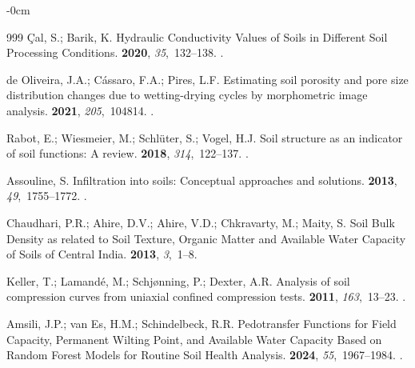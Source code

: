 \documentclass[land,review,accept,pdftex,oneauthor]{Definitions/mdpi}
\begin{document}
\begin{adjustwidth}{-\extralength}{0cm}
\begin{thebibliography}{999}
Çal, S.; Barik, K.
\newblock Hydraulic Conductivity Values of Soils in Different Soil Processing
  Conditions.
 {\bf 2020}, {\em
  35},~132--138.
.

{de Oliveira}, J.A.; C{\'a}ssaro, F.A.; Pires, L.F.
\newblock Estimating soil porosity and pore size distribution changes due to
  wetting-drying cycles by morphometric image analysis.
 {\bf 2021}, {\em 205},~104814.
.

Rabot, E.; Wiesmeier, M.; Schl{\"u}ter, S.; Vogel, H.J.
\newblock Soil structure as an indicator of soil functions: A review.
 {\bf 2018}, {\em 314},~122--137.
.

Assouline, S.
\newblock Infiltration into soils: Conceptual approaches and solutions.
 {\bf 2013}, {\em 49},~1755--1772.
.

Chaudhari, P.R.; Ahire, D.V.; Ahire, V.D.; Chkravarty, M.; Maity, S.
\newblock Soil Bulk Density as related to Soil Texture, Organic Matter and
  Available Water Capacity of Soils of Central India.
  {\bf 2013}, {\em 3},~1--8.

Keller, T.; Lamand{\'e}, M.; Schj{\o}nning, P.; Dexter, A.R.
\newblock Analysis of soil compression curves from uniaxial confined
  compression tests.
 {\bf 2011}, {\em 163},~13--23.
.

Amsili, J.P.; van Es, H.M.; Schindelbeck, R.R.
\newblock Pedotransfer Functions for Field Capacity, Permanent Wilting Point,
  and Available Water Capacity Based on Random Forest Models for Routine Soil
  Health Analysis.
 {\bf 2024},
  {\em 55},~1967--1984.
.


\end{thebibliography}
\end{adjustwidth}
\end{document}
